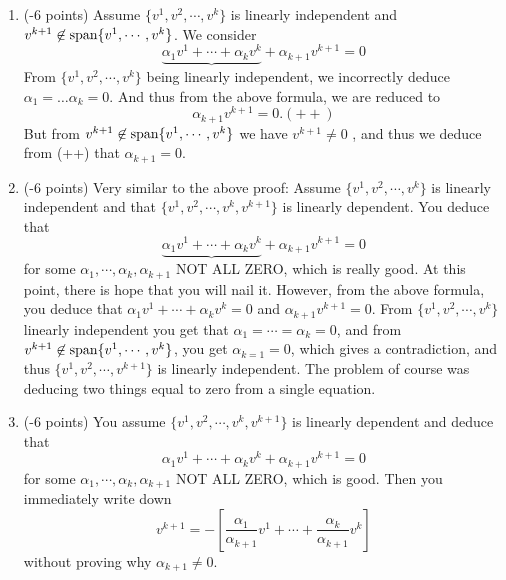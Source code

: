 \documentclass[letterpaper]{article}
\begin{document}
\begin{itemize}
\begin{enumerate}
\item  (-6 points) Assume $\{v^1, v^2, \cdots, v^{k}\}$ is linearly independent and $v^{k+1}\not \in \textrm{span} \{ v^1, \cdots, v^{k} \}$. We consider $$\underbrace{\alpha_1v^1 + \cdots + \alpha_k v^k }+ \alpha_{k+1} v^{k+1}=0$$
     From $\{v^1, v^2, \cdots, v^{k}\}$ being linearly independent, we incorrectly deduce $\alpha_1 = \ldots \alpha_k=0$. And thus from the above formula, we are reduced to $$\alpha_{k+1} v^{k+1}=0. (++)$$
    But from $v^{k+1}\not \in \textrm{span} \{ v^1, \cdots, v^{k} \}$ we have $v^{k+1}\not = 0$ , and thus we deduce from (++) that $\alpha_{k+1}=0$.

    \item (-6 points)  Very similar to the above proof: Assume $\{v^1, v^2, \cdots, v^{k}\}$ is linearly independent and that $\{v^1, v^2, \cdots, v^{k}, v^{k+1}\}$ is linearly dependent. You deduce that
$$\underbrace{\alpha_1v^1 + \cdots + \alpha_k v^k }+ \alpha_{k+1} v^{k+1}=0$$
for some $\alpha_1, \cdots, \alpha_k, \alpha_{k+1}$ NOT ALL ZERO, which is really good. At this point, there is hope that you will nail it. However, from the above formula, you deduce that $\alpha_1v^1 + \cdots + \alpha_k v^k = 0$ and $\alpha_{k+1} v^{k+1} =0$.
From $\{v^1, v^2, \cdots, v^{k}\}$  linearly independent you get that $\alpha_1=\cdots = \alpha_k=0$, and from  $v^{k+1}\not \in \textrm{span} \{ v^1, \cdots, v^{k} \}$, you get $\alpha_{k=1}=0$, which gives a contradiction, and thus $\{v^1, v^2, \cdots, v^{k+1}\}$ is linearly independent. The problem of course was deducing two things equal to zero from a single equation.


\item (-6 points)  You assume $\{v^1, v^2, \cdots, v^{k}, v^{k+1}\}$ is linearly dependent and deduce that
$$\alpha_1v^1 + \cdots + \alpha_k v^k+ \alpha_{k+1} v^{k+1}=0$$
for some $\alpha_1, \cdots, \alpha_k, \alpha_{k+1}$ NOT ALL ZERO, which is good. Then you immediately write down
$$ v^{k+1}= -\left[ \frac{\alpha_1}{\alpha_{k+1}} v^1 + \cdots + \frac{\alpha_k}{\alpha_{k+1}}  v^k\right]$$
without proving why $\alpha_{k+1} \not = 0$.




\end{enumerate}

\end{itemize}
\end{document}
